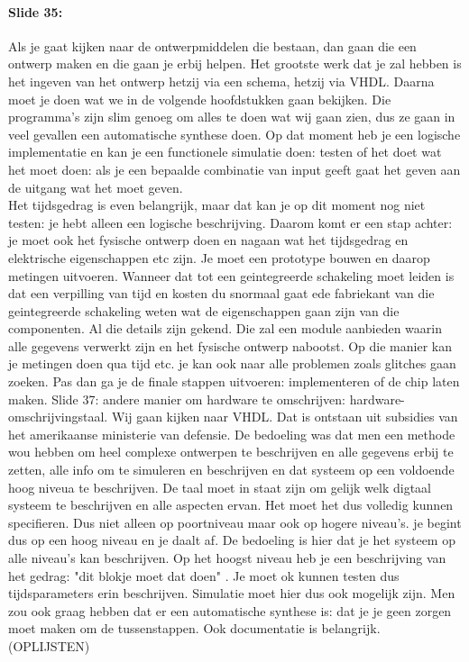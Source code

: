 \documentclass[10pt,a4paper]{book}
\begin{document}
\paragraph{Slide 35:} Als je gaat kijken naar de ontwerpmiddelen die bestaan, dan gaan die een ontwerp maken en die gaan je erbij helpen. Het grootste werk dat je zal hebben is het ingeven van het ontwerp hetzij via een schema, hetzij via VHDL. Daarna moet je doen wat we in de volgende hoofdstukken gaan bekijken. Die programma's zijn slim genoeg om alles te doen wat wij gaan zien, dus ze gaan in veel gevallen een automatische synthese doen. Op dat moment heb je een logische implementatie en kan je een functionele simulatie doen: testen of het doet wat het moet doen: als je een bepaalde combinatie van input geeft gaat het geven aan de uitgang wat het moet geven.\\ %
Het tijdsgedrag is even belangrijk, maar dat kan je op dit moment nog niet testen: je hebt alleen een logische beschrijving. Daarom komt er een stap achter: je moet ook het fysische ontwerp doen en nagaan wat het tijdsgedrag en elektrische eigenschappen etc zijn. Je moet een prototype bouwen en daarop metingen uitvoeren. Wanneer dat tot een geintegreerde schakeling moet leiden is dat een verpilling van tijd en kosten du snormaal gaat ede fabriekant van die geintegreerde schakeling weten wat de eigenschappen gaan zijn van die componenten. Al die details zijn gekend. Die zal een module aanbieden waarin alle gegevens verwerkt zijn en het fysische ontwerp nabootst. Op die manier kan je metingen doen qua tijd etc. je kan ook naar alle problemen zoals glitches gaan zoeken. Pas dan ga je de finale stappen uitvoeren: implementeren of de chip laten maken. 
Slide 37: andere manier om hardware te omschrijven: hardware-omschrijvingstaal. Wij gaan kijken naar VHDL. Dat is ontstaan uit subsidies van het amerikaanse ministerie van defensie. De bedoeling was dat men een methode wou hebben om heel complexe ontwerpen te beschrijven en alle gegevens erbij te zetten, alle info om te simuleren en beschrijven en dat systeem op een voldoende hoog niveua te beschrijven.
De taal moet in staat zijn om gelijk welk digtaal systeem te beschrijven en alle aspecten ervan. Het moet het dus volledig kunnen specifieren. Dus niet alleen op poortniveau maar ook op hogere niveau's. je begint dus op een hoog niveau en je daalt af. De bedoeling is hier dat je het systeem op alle niveau's kan beschrijven. Op het hoogst niveau heb je een beschrijving van het gedrag: "dit blokje moet dat doen" . Je moet ok kunnen testen dus tijdsparameters erin beschrijven. Simulatie moet hier dus ook mogelijk zijn. Men zou ook graag hebben dat er een automatische synthese is: dat je je geen zorgen moet maken om de tussenstappen. Ook documentatie is belangrijk. (OPLIJSTEN)
\end{document}
